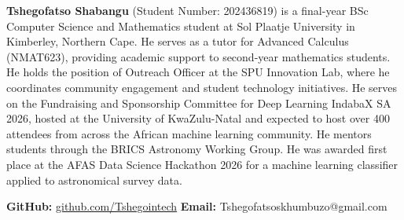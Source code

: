 \documentclass[12pt, a4paper]{article}
\begin{document}
\begin{mdframed}[
    linecolor=spunavy,
    linewidth=1pt,
    innerleftmargin=14pt,
    innerrightmargin=14pt,
    innertopmargin=12pt,
    innerbottommargin=12pt,
    backgroundcolor=lightgray,
]
\noindent\textbf{\textcolor{spunavy}{Tshegofatso Shabangu}} (Student Number: 202436819) is a final-year BSc Computer Science and Mathematics student at Sol Plaatje University in Kimberley, Northern Cape. He serves as a tutor for Advanced Calculus (NMAT623), providing academic support to second-year mathematics students. He holds the position of Outreach Officer at the SPU Innovation Lab, where he coordinates community engagement and student technology initiatives. He serves on the Fundraising and Sponsorship Committee for Deep Learning IndabaX SA 2026, hosted at the University of KwaZulu-Natal and expected to host over 400 attendees from across the African machine learning community. He mentors students through the BRICS Astronomy Working Group. He was awarded first place at the AFAS Data Science Hackathon 2026 for a machine learning classifier applied to astronomical survey data.

\vspace{0.5em}
\noindent\textbf{GitHub:} \href{https://github.com/Tshegointech}{github.com/Tshegointech} \quad \textbf{Email:} Tshegofatsoskhumbuzo@gmail.com
\end{mdframed}
\end{document}
